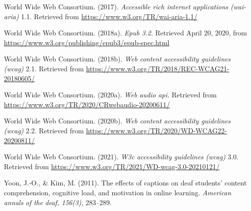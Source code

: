 \documentclass{sig-alternate} %
\begin{document}
World Wide Web Consortium. (2017). \textit{Accessible rich internet applications (wai-aria)} 1.1. Retrieved from \url{https://www.w3.org/TR/wai-aria-1.1/}

World Wide Web Consortium. (2018a). \textit{Epub 3.2.} Retrieved April 20, 2020, from \url{https://www.w3.org/publishing/epub3/epub-spec.html}

World Wide Web Consortium. (2018b). \textit{Web content accessibility guidelines (wcag)} 2.1. Retrieved from \url{https://www.w3.org/TR/2018/REC-WCAG21-20180605/}
 
World Wide Web Consortium. (2020a). \textit{Web audio api.} Retrieved from \url{https://www.w3.org/TR/2020/CRwebaudio-20200611/}

World Wide Web Consortium. (2020b). \textit{Web content accessibility guidelines (wcag)} 2.2. Retrieved from \url{https://www.w3.org/TR/2020/WD-WCAG22-20200811/}

World Wide Web Consortium. (2021). \textit{W3c accessibility guidelines (wcag)} 3.0. Retrieved from \url{https://www.w3.org/TR/2021/WD-wcag-3.0-20210121/}

Yoon, J.-O., \& Kim, M. (2011). The effects of captions on deaf students’ content comprehension, cognitive load, and motivation in online learning. \textit{American annals of the deaf, 156(3),} 283–289.
\end{document}

